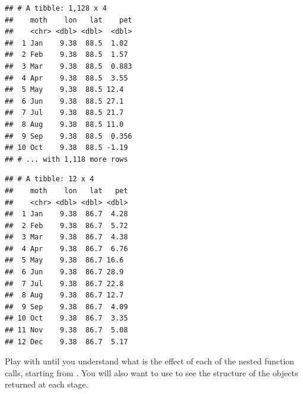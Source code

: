 \documentclass[krantz2]{krantz}\usepackage{knitr}%
\begin{document}
\begin{knitrout}\footnotesize
{}\color{fgcolor}\begin{kframe}
\begin{alltt}
 \hlkwb{<-}
    \hlstd{(} \hlstd{=} \hlstd{(month.abb[}\hlopt{:}\hlstd{],} 
            \hlstd{= longitude[}\hlstd{],}
            \hlstd{=}   \hlstd{=} \hlstd{),}
            \hlstd{=} \hlstd{(}\hlstd{(} \hlstd{)[}\hlstd{, , ]))}
           \hlstd{)}
\end{alltt}
\begin{verbatim}
## # A tibble: 1,128 x 4
##    moth    lon   lat    pet
##    <chr> <dbl> <dbl>  <dbl>
##  1 Jan    9.38  88.5  1.02 
##  2 Feb    9.38  88.5  1.57 
##  3 Mar    9.38  88.5  0.883
##  4 Apr    9.38  88.5  3.55 
##  5 May    9.38  88.5 12.4  
##  6 Jun    9.38  88.5 27.1  
##  7 Jul    9.38  88.5 21.7  
##  8 Aug    9.38  88.5 11.0  
##  9 Sep    9.38  88.5  0.356
## 10 Oct    9.38  88.5 -1.19 
## # ... with 1,118 more rows
\end{verbatim}
\begin{alltt}
 \hlopt{==} \hlstd{latitude[}\hlstd{])}
\end{alltt}
\begin{verbatim}
## # A tibble: 12 x 4
##    moth    lon   lat   pet
##    <chr> <dbl> <dbl> <dbl>
##  1 Jan    9.38  86.7  4.28
##  2 Feb    9.38  86.7  5.72
##  3 Mar    9.38  86.7  4.38
##  4 Apr    9.38  86.7  6.76
##  5 May    9.38  86.7 16.6 
##  6 Jun    9.38  86.7 28.9 
##  7 Jul    9.38  86.7 22.8 
##  8 Aug    9.38  86.7 12.7 
##  9 Sep    9.38  86.7  4.09
## 10 Oct    9.38  86.7  3.35
## 11 Nov    9.38  86.7  5.08
## 12 Dec    9.38  86.7  5.17
\end{verbatim}
\end{kframe}
\end{knitrout}

\begin{playground}
Play with  until you understand what is the effect of each of the nested function calls, starting from . You will also want to use  to see the structure of the objects returned at each stage.
\end{playground}
\end{document}
